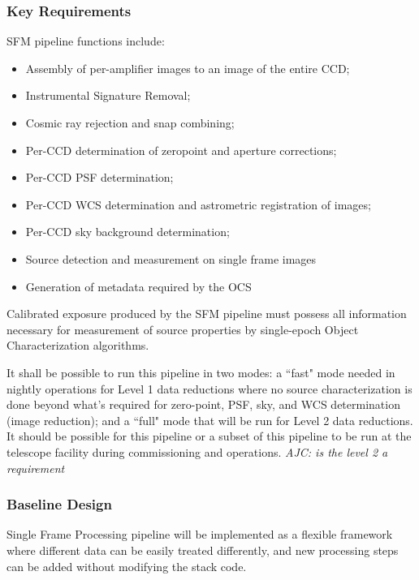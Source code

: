 \subsubsection{Key Requirements}

SFM pipeline functions include:
\begin{itemize}
\item Assembly of per-amplifier images to an image of the entire CCD;
\item Instrumental Signature Removal;
\item Cosmic ray rejection and snap combining;
\item Per-CCD determination of zeropoint and aperture corrections;
\item Per-CCD PSF determination;
\item Per-CCD WCS determination and astrometric registration of images;
\item Per-CCD sky background determination;
\item Source detection and measurement on single frame images
\item Generation of metadata required by the OCS
\end{itemize}

Calibrated exposure produced by the SFM pipeline must possess all
information necessary for measurement of source properties by
single-epoch Object Characterization algorithms.

It shall be possible to run this pipeline in two modes: a ``fast" mode
needed in nightly operations for Level 1 data reductions where no
source characterization is done beyond what's required for zero-point,
PSF, sky, and WCS determination (image reduction); and a ``full" mode
that will be run for Level 2 data reductions.  It should be possible
for this pipeline or a subset of this pipeline to be run at the
telescope facility during commissioning and operations.  \emph{AJC: is the level 2 a requirement}


\subsubsection{Baseline Design}

Single Frame Processing pipeline will be implemented as a flexible
framework where different data can be easily treated differently, and
new processing steps can be added without modifying the stack code.

